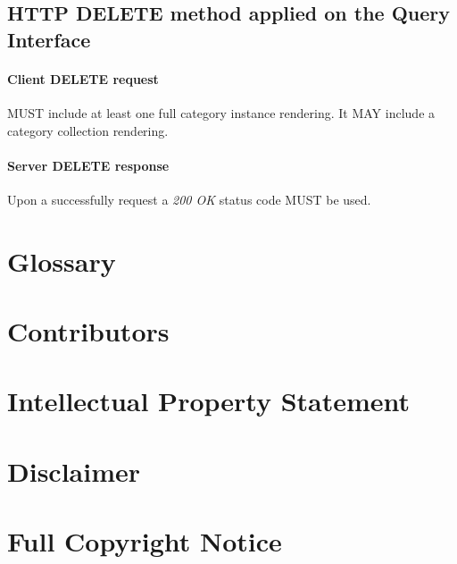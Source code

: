 \documentclass[10pt,a4paper]{article}
\begin{document}
\subsection{HTTP DELETE method applied on the Query Interface}

\paragraph{Client DELETE request}
MUST include at least one full category instance rendering. It MAY include a category collection rendering.

\paragraph{Server DELETE response}
Upon a successfully request a \emph{200 OK} status code MUST be used.

\section{Glossary}
\label{sec:glossary}


\section{Contributors}


\section{Intellectual Property Statement}


\section{Disclaimer}


\section{Full Copyright Notice}




\end{document}
